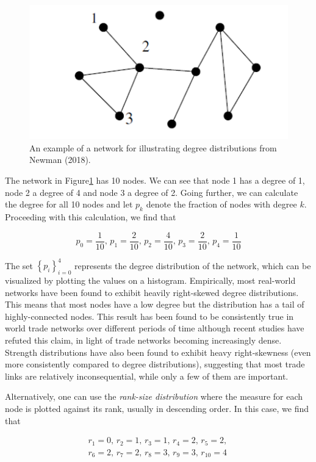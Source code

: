 \documentclass[12pt,letterpaper]{report}
\begin{document}
\begin{figure}[!h]
\centering
\includegraphics[width=0.5\columnwidth]{Fig302-NetworkDegree.png}
\caption{An example of a network for illustrating degree distributions from Newman (2018).}\label{fig:302NetworkDegree}
\end{figure}	
	
	The network in Figure\ref{fig:302NetworkDegree} has 10 nodes. We can see that node 1 has a degree of 1, node 2 a degree of 4 and node 3 a degree of 2. Going further, we can calculate the degree for all 10 nodes and let $p_k$ denote the fraction of nodes with degree $k$. Proceeding with this calculation, we find that 
	
\begin{equation}
\label{eqn:305DegreeDistribution} p_0 = \frac{1}{10} \textrm{, } p_1 = \frac{2}{10} \textrm{, } p_2 = \frac{4}{10} \textrm{, } p_3 = \frac{2}{10} \textrm{, } p_4 = \frac{1}{10}
\end{equation}

	The set  $\left\{p_i\right\}_{i=0}^{4}$ represents the degree distribution of the network, which can be visualized by plotting the values on a histogram. Empirically, most real-world networks have been found to exhibit heavily right-skewed degree distributions. This means that most nodes have a low degree but the distribution has a tail of highly-connected nodes. This result has been found to be consistently true in world trade networks over different periods of time \cite{de2014network} although recent studies have refuted this claim, in light of trade networks becoming increasingly dense. \cite{cepeda2019evolution} Strength distributions have also been found to exhibit heavy right-skewness (even more consistently compared to degree distributions), suggesting that most trade links are relatively inconsequential, while only a few of them are important.
	
	Alternatively, one can use the \textit{rank-size distribution} where the measure for each node is plotted against its rank, usually in descending order. In this case, we find that
	
	\begin{equation}
	\begin{aligned}
	\label{eqn:306RankSizeDistribution} r_1 = 0 \textrm{, } r_2 = 1 \textrm{, } r_3 = 1 \textrm{, } r_4 = 2 \textrm{, } r_5 = 2 \textrm{, } \\  r_6 = 2 \textrm{, } r_7 = 2 \textrm{, } r_8 = 3 \textrm{, } r_9 = 3 \textrm{, } r_{10} = 4
	\end{aligned}
	\end{equation}
	
\end{document}
